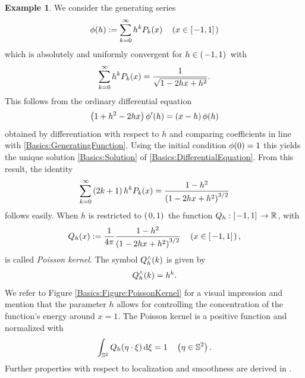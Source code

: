 \documentclass[11pt,a4paper,twoside,bibtotoc]{scrartcl}
\theoremstyle{plain}
\theoremstyle{definition}
\newtheorem{example}[theorem]{Example}
\theoremstyle{remark}
\numberwithin{equation}{section}
\numberwithin{table}{section}
\numberwithin{figure}{section}
\begin{document}
\begin{example}
We consider the generating series
\begin{equation}
  \label{Basics:GeneratingFunction}
  \phi{\hspace{-0.4ex}}\left(h\right) := \sum_{k = 0}^{\infty} h^k P_k{\hspace{-0.4ex}}\left(x\right) \quad \left(x \in \left[\left.-1,1\right]\right.\right)
\end{equation}
which is absolutely and uniformly convergent for $h \in
\left(\left.-1,1\right)\right.$ with
\begin{equation}
  \label{Basics:Solution}
  \sum_{k = 0}^{\infty} h^k P_k{\hspace{-0.4ex}}\left(x\right) = \frac{1}{\sqrt{1-2hx+h^2}}.
\end{equation}
This follows from the ordinary differential equation
\begin{equation}
\label{Basics:DifferentialEquation}
  \left(1+h^2-2hx\right)\phi'{\hspace{-0.4ex}}\left(h\right) = \left(x-h\right)\phi{\hspace{-0.4ex}}\left(h\right)
\end{equation}
obtained by differentiation with respect to $h$ and comparing coefficients in line with \eqref{Basics:GeneratingFunction}. Using the initial 
condition $\phi{\hspace{-0.4ex}}\left(0\right)=1$ this yields the unique solution \eqref{Basics:Solution} of \eqref{Basics:DifferentialEquation}.
From this result, the identity
\begin{equation}
  \nonumber
  \sum_{k=0}^{\infty} \left(2k+1\right) h^k P_k{\hspace{-0.4ex}}\left(x\right) =
  \frac{1-h^2}{\left(1-2hx+h^2\right)^{3/2}}
\end{equation}
 follows easily. When $h$ is restricted to $\left(\left.0,1\right)\right.$ the function
$Q_{h}:\left[\left.-1,1\right]\right. \rightarrow \mathbb{R}$, with
\begin{equation}
  \label{PoissonKernel}
  \nonumber
  Q_{h}{\hspace{-0.4ex}}\left(x\right) := \frac{1}{4\pi} \frac{1-h^2}{\left(1-2hx+h^2\right)^{3/2}} \quad \left(x \in \left[\left.-1,1\right]\right.\right),
\end{equation}
is called \emph{Poisson kernel}. The symbol $Q_{h}^{\wedge}{\hspace{-0.4ex}}\left(k\right)$ is given by 
\[
  Q_{h}^{\wedge}{\hspace{-0.4ex}}\left(k\right) = h^k.
\]
We refer to Figure \ref{Basics:Figure:PoissonKernel} 
for a visual impression and mention that the parameter $h$
allows for controlling the concentration of the function's energy around
$x = 1$. The Poisson kernel is a positive function and normalized with
\[
  \int_{\mathbb{S}^2} Q_{h}{\hspace{-0.4ex}}\left(\mathbf{\eta} \cdot \mathbf{\xi}\right) \text{\rm{d}} \mathbf{\xi} = 1 \quad \left(\mathbf{\eta} \in \mathbb{S}^2\right).
\]
Further properties with respect to localization and smoothness are derived in \cite[pp. 112]{frgesc}.
\end{example}
\end{document}
